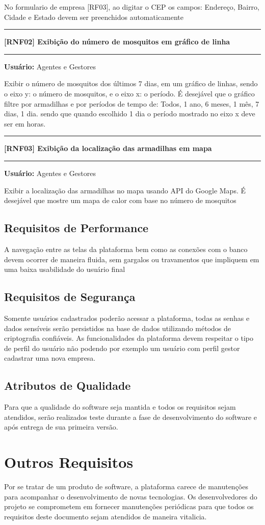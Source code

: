 \documentclass{scrreprt}
\begin{document}
	No formulario de empresa [RF03], ao digitar o CEP os campos: Endereço, Bairro, Cidade e Estado devem ser preenchidos automaticamente
	\begin{center}
		\noindent\rule{16cm}{0.4pt}
		\textbf{[RNF02] Exibição do número de mosquitos em gráfico de linha}
		\noindent\rule{16cm}{0.4pt}
	\end{center}
	\textbf{Usuário:} Agentes e Gestores
	
	Exibir o número de mosquitos dos últimos 7 dias, em um gráfico de linhas, sendo o eixo y: o número de mosquitos, e o eixo x: o período. É desejável que o gráfico filtre por armadilhas e por períodos de tempo de: Todos, 1 ano, 6 meses, 1 mês, 7 dias, 1 dia. sendo que quando escolhido 1 dia o período mostrado no eixo x deve ser em horas.
	\begin{center}
		\noindent\rule{16cm}{0.4pt}
		\textbf{[RNF03] Exibição da localização das armadilhas em mapa}
		\noindent\rule{16cm}{0.4pt}
	\end{center}
	\textbf{Usuário:} Agentes e Gestores
	
	Exibir a localização das armadilhas no mapa usando API do Google Maps. É desejável que mostre um mapa de calor com base no número de mosquitos 
	
	\section{Requisitos de Performance}
	A navegação entre as telas da plataforma bem como as conexões com o banco devem ocorrer de maneira fluida, sem gargalos ou travamentos que impliquem em uma baixa usabilidade do usuário final
	
	\section{Requisitos de Segurança}
	Somente usuários cadastrados poderão acessar a plataforma, todas as senhas e dados sensíveis serão persistidos na base de dados utilizando métodos de criptografia confiáveis.
	As funcionalidades da plataforma devem respeitar o tipo de perfil do usuário não podendo por exemplo um usuário com perfil gestor cadastrar uma nova empresa.
	
	\section{Atributos de Qualidade}
	Para que a qualidade do software seja mantida e todos os requisitos sejam atendidos, serão realizados teste durante a fase de desenvolvimento do software e após entrega de sua primeira versão.
	
	\chapter{Outros Requisitos}
	Por se tratar de um produto de software, a plataforma carece de manutenções para acompanhar o desenvolvimento de novas tecnologias. Os desenvolvedores do projeto se comprometem em fornecer manutenções periódicas para que todos os requisitos deste documento sejam atendidos de maneira vitalicia.
\end{document}
